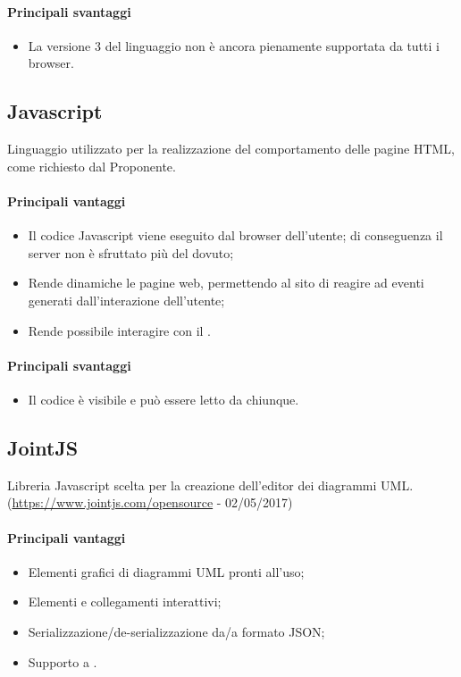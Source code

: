 \documentclass[../PianoDiQualifica.tex]{subfiles}
\begin{document}
			\paragraph{Principali svantaggi}
				\begin{itemize}
					\item La versione 3 del linguaggio non è ancora pienamente supportata da tutti
					i browser. 
				\end{itemize}
		\subsection{Javascript}
			Linguaggio utilizzato per la realizzazione del comportamento delle pagine HTML, come
			richiesto dal Proponente.
			\paragraph{Principali vantaggi}
			\begin{itemize}
					\item Il codice Javascript viene eseguito dal browser dell'utente; di conseguenza
					il server non è sfruttato più del dovuto;
					\item Rende dinamiche le pagine web, permettendo al sito di reagire ad eventi
					generati dall'interazione dell'utente;
					\item Rende possibile interagire con il .
				\end{itemize}
			\paragraph{Principali svantaggi}
				\begin{itemize}
					\item Il codice è visibile e può essere letto da chiunque.
				\end{itemize}
		\subsection{JointJS}
			Libreria Javascript scelta per la creazione dell'editor dei diagrammi UML.\\
			(\url{https://www.jointjs.com/opensource} - 02/05/2017)
			\paragraph{Principali vantaggi}
			\begin{itemize}
					\item Elementi grafici di diagrammi UML pronti all'uso;
					\item Elementi e collegamenti interattivi;
					\item Serializzazione/de-serializzazione da/a formato JSON;
					\item Supporto a .
				\end{itemize}
\end{document}
